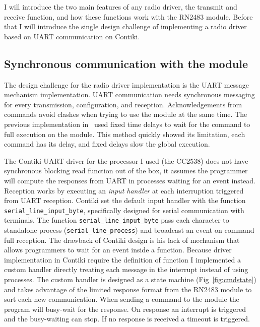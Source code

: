 I will introduce the two main features of any radio driver, the transmit and receive
function, and how these functions work with the RN2483 module.
Before that I will introduce the single design challenge of implementing a radio
driver based on UART communication on Contiki.

\subsection{Synchronous communication with the module}

The design challenge for the radio driver implementation is the
UART message mechanism implementation.
UART communication needs synchronous messaging for every
transmission, configuration, and reception.
Acknowledgements from commands avoid
clashes when trying to use the module at the same time.
The previous implementation in~\cite{8847137} used fixed time delays to
wait for the command to full execution on the module. This method
quickly showed its limitation, each command has its delay, and
fixed delays slow the global execution.

The Contiki UART driver for the processor I used (the CC2538) does not have synchronous
blocking read function out of the box, it assumes the programmer will compute the
responses from UART in processes waiting for an event instead.
Reception works by executing an \emph{input handler} at each interruption
triggered from UART reception.
Contiki set the default input handler with the function
\lstinline{serial_line_input_byte},
specifically designed for serial communication with terminals.
The function \lstinline{serial_line_input_byte} pass each character to standalone
process (\lstinline{serial_line_process}) and broadcast an event on command
full reception.
The drawback of Contiki design is his lack of mechanism that allows programmers
to wait for an event inside a function.
Because driver implementation in Contiki require the definition of function
I implemented a custom handler directly treating each message in the
interrupt instead of using processes.
The custom handler is designed as a state machine (Fig~\ref{fig:cmdstate}) and
takes advantage of the limited response
format from the RN2483 module to sort each new communication.
When sending a command to the module the program will busy-wait for the
response. On response an interrupt is triggered and the busy-waiting can stop.
If no response is received a timeout is triggered.



